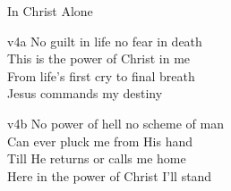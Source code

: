 \begin{song}{In Christ Alone}
    \begin{songframe}{v4a}
    No guilt in life no fear in death \\
    This is the power of Christ in me \\
    From life's first cry to final breath \\
    Jesus commands my destiny
    \end{songframe}
    
    \begin{songframe}{v4b}
    No power of hell no scheme of man \\
    Can ever pluck me from His hand \\
    Till He returns or calls me home \\
    Here in the power of Christ I'll stand
    \end{songframe}


\end{song}
\endinput
